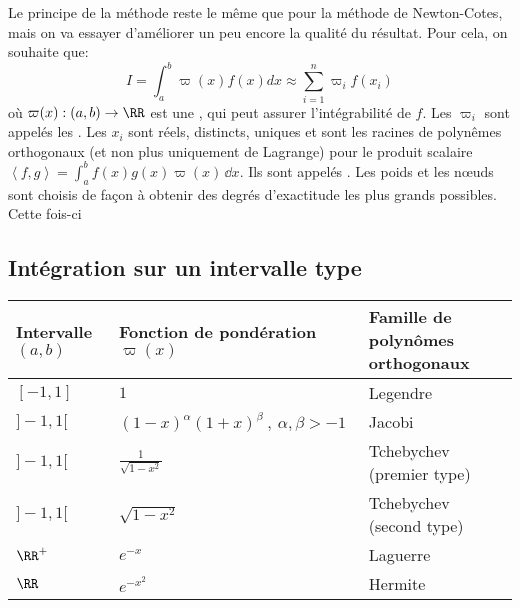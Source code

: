 Le principe de la méthode reste le même que pour la méthode de Newton-Cotes, mais
on va essayer d'améliorer un peu encore la qualité du résultat.
Pour cela, on souhaite que:
\begin{equation}I=\int_a^b \varpi(x)f(x)dx \approx \sum_{i=1}^n \varpi_if(x_i)\end{equation}
où $\varpi(x): (a,b)\rightarrow\RR$ est une , 
qui peut assurer l'intégrabilité de $f$. 
Les $\varpi_i$ sont appelés les .
Les $x_i$ sont réels, distincts, uniques et sont les racines de polynêmes orthogonaux 
(et non plus uniquement de Lagrange) pour le produit scalaire 
$\left\langle f,g \right\rangle = \int_a^b f(x)g(x) \varpi(x) \,\dd x$. 
Ils sont appelés  .
Les poids et les nœuds sont choisis de façon à obtenir des degrés d'exactitude les plus 
grands possibles.
Cette fois-ci 

\medskip
\subsection*{Intégration sur un intervalle type}


\begin{center}
\begin{tabular}{lll}
Intervalle $(a,b)$ & Fonction de pondération $\varpi(x)$ & Famille de polynômes orthogonaux\\
\hline
$[-1,1]$ & $1$ & Legendre\\
$]-1,1[$ & $(1-x)^\alpha (1+x)^\beta \ , \ \alpha, \beta > -1$ & Jacobi\\
$]-1,1[$ & $\frac{1}{\sqrt{1-x^2}}$ &Tchebychev (premier type)\\
$]-1,1[$ & $\sqrt{1-x^2}$ & Tchebychev (second type)\\
$\RR^+$ & $e^{-x}$ & Laguerre\\
$\RR$ & $e^{-x^2}$ & Hermite\\
\end{tabular}
\end{center}

